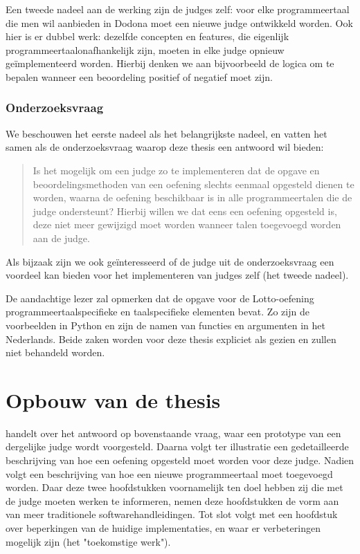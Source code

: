 Een tweede nadeel aan de werking zijn de judges zelf: voor elke programmeertaal die men wil aanbieden in Dodona moet een nieuwe judge ontwikkeld worden.
Ook hier is er dubbel werk: dezelfde concepten en features, die eigenlijk programmeertaalonafhankelijk zijn, moeten in elke judge opnieuw geïmplementeerd worden.
Hierbij denken we aan bijvoorbeeld de logica om te bepalen wanneer een beoordeling positief of negatief moet zijn.

\subsubsection{Onderzoeksvraag}

We beschouwen het eerste nadeel als het belangrijkste nadeel, en vatten het samen als de onderzoeksvraag waarop deze thesis een antwoord wil bieden:

\begin{quote}
    Is het mogelijk om een judge zo te implementeren dat de opgave en beoordelingsmethoden van een oefening slechts eenmaal opgesteld dienen te worden, waarna de oefening beschikbaar is in alle programmeertalen die de judge ondersteunt?
    Hierbij willen we dat eens een oefening opgesteld is, deze niet meer gewijzigd moet worden wanneer talen toegevoegd worden aan de judge.
\end{quote}

Als bijzaak zijn we ook geïnteresseerd of de judge uit de onderzoeksvraag een voordeel kan bieden voor het implementeren van judges zelf (het tweede nadeel).

De aandachtige lezer zal opmerken dat de opgave voor de Lotto-oefening programmeertaalspecifieke en taalspecifieke elementen bevat.
Zo zijn de voorbeelden in Python en zijn de namen van functies en argumenten in het Nederlands.
Beide zaken worden voor deze thesis expliciet als  gezien en zullen niet behandeld worden.

\section{Opbouw van de thesis}\label{sec:opbouw}

 handelt over het antwoord op bovenstaande vraag, waar een prototype van een dergelijke judge wordt voorgesteld.
Daarna volgt ter illustratie een gedetailleerde beschrijving van hoe een oefening opgesteld moet worden voor deze judge.
Nadien volgt een beschrijving van hoe een nieuwe programmeertaal moet toegevoegd worden.
Daar deze twee hoofdstukken voornamelijk ten doel hebben zij die met de judge moeten werken te informeren, nemen deze hoofdstukken de vorm aan van meer traditionele softwarehandleidingen.
Tot slot volgt met een hoofdstuk over beperkingen van de huidige implementaties, en waar er verbeteringen mogelijk zijn (het "toekomstige werk").
